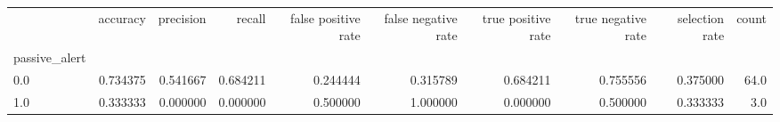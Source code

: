 \begin{tabular}{lrrrrrrrrr}
\toprule
{} &  accuracy &  precision &    recall &  false positive rate &  false negative rate &  true positive rate &  true negative rate &  selection rate &  count \\
passive\_alert &           &            &           &                      &                      &                     &                     &                 &        \\
\midrule
0.0           &  0.734375 &   0.541667 &  0.684211 &             0.244444 &             0.315789 &            0.684211 &            0.755556 &        0.375000 &   64.0 \\
1.0           &  0.333333 &   0.000000 &  0.000000 &             0.500000 &             1.000000 &            0.000000 &            0.500000 &        0.333333 &    3.0 \\
\bottomrule
\end{tabular}
